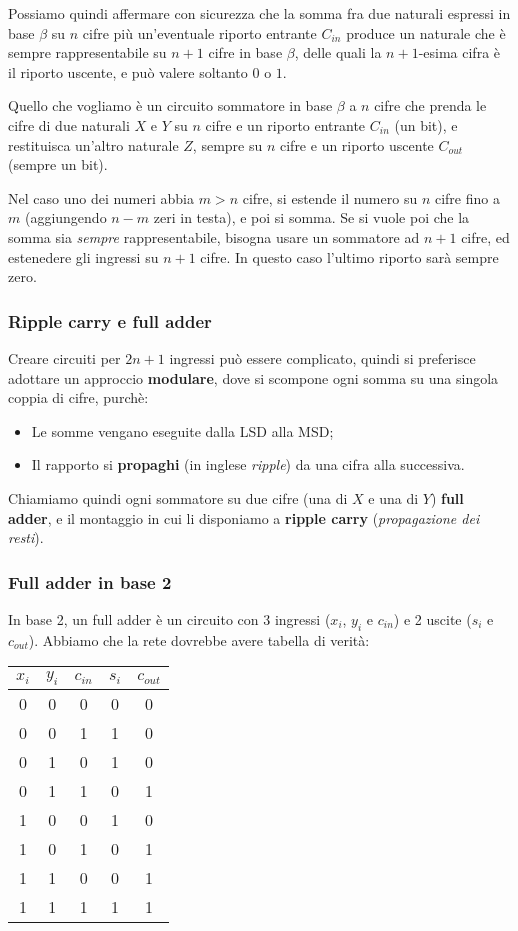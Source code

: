 \documentclass[a4paper,11pt]{article}
\begin{document}
\par\smallskip

Possiamo quindi affermare con sicurezza che la somma fra due naturali espressi in base $\beta$ su $n$ cifre più un'eventuale riporto entrante $C_{in}$ produce un naturale che è sempre rappresentabile su $n+1$ cifre in base $\beta$, delle quali la $n+1$-esima cifra è il riporto uscente, e può valere soltanto $0$ o $1$.

Quello che vogliamo è un circuito sommatore in base $\beta$ a $n$ cifre che prenda le cifre di due naturali $X$ e $Y$ su $n$ cifre e un riporto entrante $C_{in}$ (un bit), e restituisca un'altro naturale $Z$, sempre su $n$ cifre e un riporto uscente $C_{out}$ (sempre un bit). 

Nel caso uno dei numeri abbia $m > n$ cifre, si estende il numero su $n$ cifre fino a $m$ (aggiungendo $n - m$ zeri in testa), e poi si somma.
Se si vuole poi che la somma sia \textit{sempre} rappresentabile, bisogna usare un sommatore ad $n+1$ cifre, ed estenedere gli ingressi su $n+1$ cifre.
In questo caso l'ultimo riporto sarà sempre zero.

\subsubsection{Ripple carry e full adder}
Creare circuiti per $2n + 1$ ingressi può essere complicato, quindi si preferisce adottare un approccio \textbf{modulare}, dove si scompone ogni somma su una singola coppia di cifre, purchè:
\begin{itemize}
	\item Le somme vengano eseguite dalla LSD alla MSD;
	\item Il rapporto si \textbf{propaghi} (in inglese \textit{ripple}) da una cifra alla successiva.
\end{itemize}
Chiamiamo quindi ogni sommatore su due cifre (una di $X$ e una di $Y$) \textbf{full adder}, e il montaggio in cui li disponiamo a \textbf{ripple carry} (\textit{propagazione dei resti}).

\subsubsection{Full adder in base 2}
In base 2, un full adder è un circuito con 3 ingressi ($x_i$, $y_i$ e $c_{in}$) e 2 uscite ($s_i$ e $c_{out}$).
Abbiamo che la rete dovrebbe avere tabella di verità:

\begin{table}[H]
	\center 
	\begin{tabular} { c  c  c | c  c }
		$x_i$ & $y_i$ & $c_{in}$ & $s_{i}$ & $c_{out}$ \\ 
		\hline
		0 & 0 & 0 & 0 & 0 \\ 
		0 & 0 & 1 & 1 & 0 \\ 
		0 & 1 & 0 & 1 & 0 \\ 
		0 & 1 & 1 & 0 & 1 \\ 
		1 & 0 & 0 & 1 & 0 \\ 
		1 & 0 & 1 & 0 & 1 \\ 
		1 & 1 & 0 & 0 & 1 \\ 
		1 & 1 & 1 & 1 & 1 
	\end{tabular}
\end{table}
\end{document}
